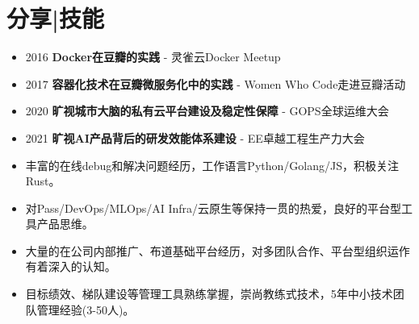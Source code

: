 \documentclass{resume}
\begin{document}
\section{分享|技能}
\begin{itemize}
    \item 2016 \quad \textbf{Docker在豆瓣的实践 } - 灵雀云Docker Meetup
    \item 2017 \quad \textbf{容器化技术在豆瓣微服务化中的实践 } - Women Who Code走进豆瓣活动
    \item 2020 \quad \textbf{旷视城市大脑的私有云平台建设及稳定性保障} - GOPS全球运维大会
    \item 2021 \quad \textbf{旷视AI产品背后的研发效能体系建设} - EE卓越工程生产力大会
\end{itemize}
\begin{itemize}
    \item 丰富的在线debug和解决问题经历，工作语言Python/Golang/JS，积极关注Rust。
    \item 对Pass/DevOps/MLOps/AI Infra/云原生等保持一贯的热爱，良好的平台型工具产品思维。
    \item 大量的在公司内部推广、布道基础平台经历，对多团队合作、平台型组织运作有着深入的认知。
    \item 目标绩效、梯队建设等管理工具熟练掌握，崇尚教练式技术，5年中小技术团队管理经验(3-50人)。
\end{itemize}
\end{document}
